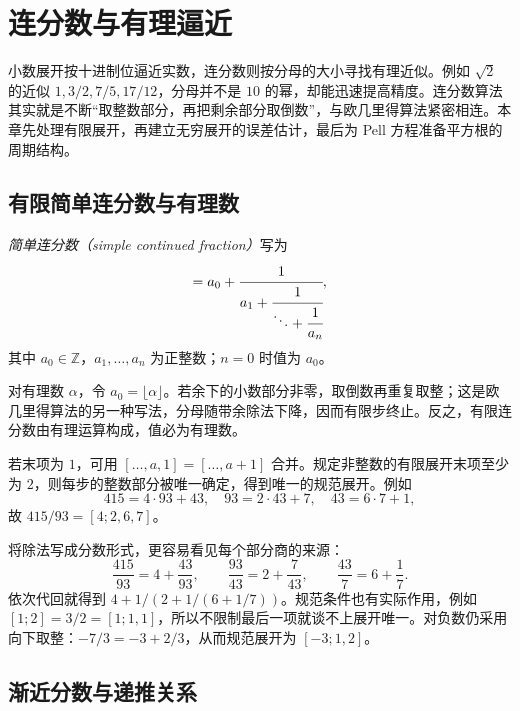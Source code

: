 \setcounter{chapter}{10} %
\chapter{连分数与有理逼近}
\label{ch:continued-fractions}

小数展开按十进制位逼近实数，连分数则按分母的大小寻找有理近似。例如 $\sqrt2$ 的近似 $1,3/2,7/5,17/12$，分母并不是 $10$ 的幂，却能迅速提高精度。连分数算法其实就是不断“取整数部分，再把剩余部分取倒数”，与欧几里得算法紧密相连。本章先处理有限展开，再建立无穷展开的误差估计，最后为 Pell 方程准备平方根的周期结构。

\section{有限简单连分数与有理数}

\begin{definition}
\emph{简单连分数（simple continued fraction）}写为
\begin{equation}
 [a_0;a_1,\ldots,a_n]
 =a_0+\cfrac1{a_1+\cfrac1{\ddots+\cfrac1{a_n}}},
 \label{eq:finite-continued-fraction}
\end{equation}
其中 $a_0\in\mathbb Z$，$a_1,\ldots,a_n$ 为正整数；$n=0$ 时值为 $a_0$。
\end{definition}

对有理数 $\alpha$，令 $a_0=\lfloor\alpha\rfloor$。若余下的小数部分非零，取倒数再重复取整；这是欧几里得算法的另一种写法，分母随带余除法下降，因而有限步终止。反之，有限连分数由有理运算构成，值必为有理数。

若末项为 $1$，可用 $[\ldots,a,1]=[\ldots,a+1]$ 合并。规定非整数的有限展开末项至少为 $2$，则每步的整数部分被唯一确定，得到唯一的规范展开。例如
\[
 415=4\cdot93+43,\quad93=2\cdot43+7,\quad43=6\cdot7+1,
\]
故 $415/93=[4;2,6,7]$。

将除法写成分数形式，更容易看见每个部分商的来源：
\[
 \frac{415}{93}=4+\frac{43}{93},\qquad
 \frac{93}{43}=2+\frac7{43},\qquad
 \frac{43}{7}=6+\frac17.
\]
依次代回就得到 $4+1/(2+1/(6+1/7))$。规范条件也有实际作用，例如 $[1;2]=3/2=[1;1,1]$，所以不限制最后一项就谈不上展开唯一。对负数仍采用向下取整：$-7/3=-3+2/3$，从而规范展开为 $[-3;1,2]$。

\section{渐近分数与递推关系}

